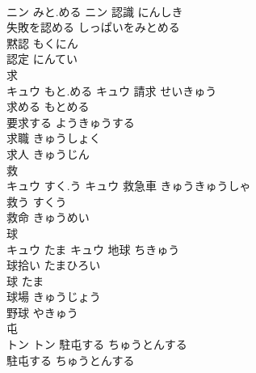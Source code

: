 \documentclass[8pt]{extreport}
\begin{document}
\begin{CJK}{UTF8}{min}
\\	ニン	みと.める	ニン	認識	にんしき	
\\	失敗を認める	しっぱいをみとめる	
\\	黙認	もくにん	
\\	認定	にんてい	
\\	求	
\\	キュウ	もと.める	キュウ	請求	せいきゅう	
\\	求める	もとめる	
\\	要求する	ようきゅうする	
\\	求職	きゅうしょく	
\\	求人	きゅうじん	
\\	救	
\\	キュウ	すく.う	キュウ	救急車	きゅうきゅうしゃ	
\\	救う	すくう	
\\	救命	きゅうめい	
\\	球	
\\	キュウ	たま	キュウ	地球	ちきゅう	
\\	球拾い	たまひろい	
\\	球	たま	
\\	球場	きゅうじょう	
\\	野球	やきゅう	
\\	屯	
\\	トン		トン	駐屯する	ちゅうとんする	
\\	駐屯する	ちゅうとんする	
\end{CJK}
\end{document}
